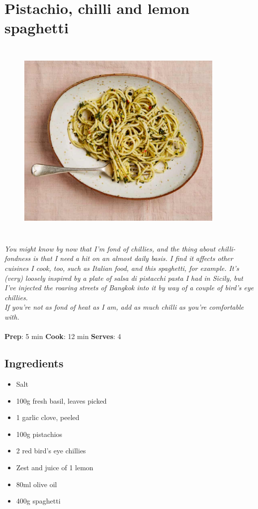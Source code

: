 \documentclass{book}
\begin{document}
\section{Pistachio, chilli and lemon spaghetti}
\begin{figure}
\centering\includegraphics[width=10cm,height=10cm,keepaspectratio]{Recipe_Pictures/Pistachio,_chilli_and_lemon_spaghetti.png}
\end{figure}
\emph{You might know by now that I’m fond of chillies, and the thing about chilli-fondness is that I need a hit on an almost daily basis. I find it affects other cuisines I cook, too, such as Italian food, and this spaghetti, for example. It’s (very) loosely inspired by a plate of salsa di pistacchi pasta I had in Sicily, but I’ve injected the roaring streets of Bangkok into it by way of a couple of bird’s eye chillies.\\ 
If you’re not as fond of heat as I am, add as much chilli as you’re comfortable with.}\\\\ 
\textbf{Prep}: 5 min
\textbf{Cook}: 12 min
\textbf{Serves}: 4
\subsection*{Ingredients}
\begin{itemize}
\item Salt 
\item 100g fresh basil, leaves picked
\item 1 garlic clove, peeled
\item 100g pistachios
\item 2 red bird’s eye chillies
\item Zest and juice of 1 lemon
\item 80ml olive oil
\item 400g spaghetti
\end{itemize}
\end{document}
